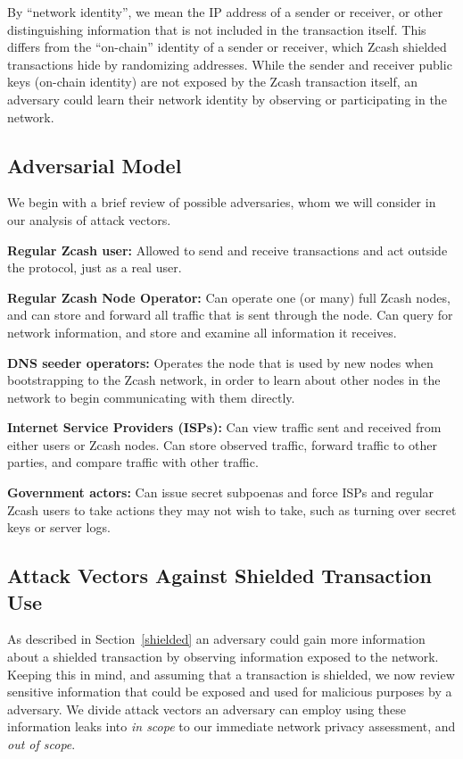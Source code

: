 \documentclass{article}
\begin{document}
By ``network identity'', we mean the IP address of a sender or receiver, or other
distinguishing information that is not included in the transaction itself. This
differs from the ``on-chain'' identity of a sender or receiver, which Zcash
shielded transactions hide by randomizing addresses.
While the sender and receiver public keys (on-chain identity)
are not exposed by the Zcash transaction itself, an adversary
could learn their network identity by observing or participating in the
network.

\subsection{Adversarial Model}

We begin with a brief review of possible adversaries, whom we will consider in
our analysis of attack vectors.

\textbf{Regular Zcash user:} Allowed to send and receive transactions and act
outside the protocol, just as a real user.

\textbf{Regular Zcash Node Operator:} Can operate one (or many) full Zcash
nodes, and can store and forward all traffic that is sent through the node. Can
query for network information, and store and examine all information it
receives.

\textbf{DNS seeder operators:} Operates the node that is used by new nodes when
bootstrapping to the Zcash network, in order to learn about other nodes in the
network to begin communicating with them directly.

\textbf{Internet Service Providers (ISPs):} Can view traffic sent and received
from either users or Zcash nodes. Can store observed traffic, forward traffic
to other parties, and compare traffic with other traffic.

\textbf{Government actors:} Can issue secret subpoenas and force ISPs and
regular Zcash users to take actions they may not wish to take, such as turning
over secret keys or server logs.


\subsection{Attack Vectors Against Shielded Transaction Use}
As described in Section~\ref{shielded} an adversary could gain more information
about a shielded transaction by observing information exposed to the network.
Keeping this in mind, and assuming that a transaction is shielded, we now
review sensitive information that could be exposed and used for malicious
purposes by a adversary.
We divide attack vectors an adversary can employ using these information leaks
into \emph{in scope} to our immediate network privacy assessment, and \emph{out
of scope}.
\end{document}
